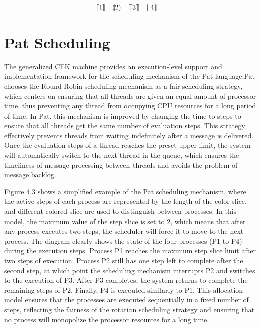 \documentclass{l4proj}
\begin{document}
\begin{equation}
  \llbracket     1 \rrbracket       \quad
  \llparenthesis 2 \rrparenthesis   \quad
  \llceil        3 \rrceil          \quad
  \llfloor       4 \rrfloor         \quad
\end{equation}


\section{Pat Scheduling}
The generalized CEK machine provides an execution-level support and implementation framework for the scheduling mechanism of the Pat language.Pat chooses the Round-Robin scheduling mechanism as a fair scheduling strategy, which centers on ensuring that all threads are given an equal amount of processor time, thus preventing any thread from occupying CPU resources for a long period of time. In Pat, this mechanism is improved by changing the time to steps to ensure that all threads get the same number of evaluation steps. This strategy effectively prevents threads from waiting indefinitely after a message is delivered. Once the evaluation steps of a thread reaches the preset upper limit, the system will automatically switch to the next thread in the queue, which ensures the timeliness of message processing between threads and avoids the problem of message backlog.

Figure 4.3 shows a simplified example of the Pat scheduling mechanism, where the active steps of each process are represented by the length of the color slice, and different colored slice are used to distinguish between processes. In this model, the maximum value of the step slice is set to 2, which means that after any process executes two steps, the scheduler will force it to move to the next process. The diagram clearly shows the state of the four processes (P1 to P4) during the execution steps. Process P1 reaches the maximum step slice limit after two steps of execution. Process P2 still has one step left to complete after the second step, at which point the scheduling mechanism interrupts P2 and switches to the execution of P3. After P3 completes, the system returns to complete the remaining steps of P2. Finally, P4 is executed similarly to P1. This allocation model ensures that the processes are executed sequentially in a fixed number of steps, reflecting the fairness of the rotation scheduling strategy and ensuring that no process will monopolize the processor resources for a long time.
\end{document}
